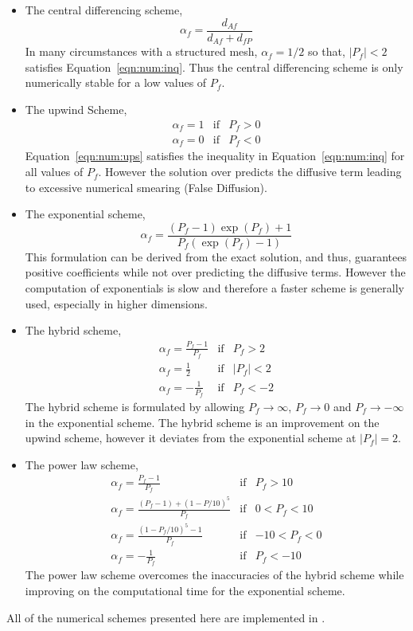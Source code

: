 \begin{itemize}
%
%
%
\item The central differencing scheme,
\begin{equation}
\alpha_f = \frac{d_{Af}}{d_{Af}+d_{fP}}
\label{eqn:num:cds}
\end{equation}
In many circumstances with a structured mesh, $\alpha_f=1/2$ so that,
$|P_f|<2$ satisfies Equation~\eqref{eqn:num:inq}.  Thus the central
differencing scheme is only numerically stable for a low values of
$P_f$.
%
%
%
\item The upwind Scheme,
\begin{eqnarray}
\alpha_f = 1 & \mbox{if} & P_f > 0 \\
\alpha_f = 0 & \mbox{if} & P_f < 0 
\label{eqn:num:ups}
\end{eqnarray}
Equation~\eqref{eqn:num:ups} satisfies the inequality in
Equation~\eqref{eqn:num:inq} for all values of $P_f$.  However the
solution over predicts the diffusive term leading to excessive
numerical smearing (False Diffusion).
%
%
%
\item The exponential scheme,
\begin{equation}
\alpha_f = \frac{(P_f-1)\exp{(P_f)}+1}{P_f(\exp{(P_f)}-1)}
\label{eqn:num:exs}
\end{equation}
This formulation can be derived from the exact solution, and thus,
guarantees positive coefficients while not over predicting the
diffusive terms. However the computation of exponentials is slow and
therefore a faster scheme is generally used, especially in higher
dimensions.
%
%
%
\item The hybrid scheme,
\begin{eqnarray}
\alpha_f = \frac{P_f-1}{P_f} & \mbox{if} & P_f > 2 \\
\alpha_f = \frac{1}{2} & \mbox{if} & |P_f| < 2 \\
\alpha_f = -\frac{1}{P_f} & \mbox{if} & P_f < -2
\label{eqn:num:hys}
\end{eqnarray}
The hybrid scheme is formulated by allowing $P_f \rightarrow \infty$,
$P_f \rightarrow 0$ and $P_f \rightarrow -\infty$ in the exponential
scheme.  The hybrid scheme is an improvement on the upwind scheme,
however it deviates from the exponential scheme at $|P_f|=2$.
%
%
%
\item The power law scheme,
\begin{eqnarray}
\alpha_f = \frac{P_f-1}{P_f} & \mbox{if} & P_f > 10 \\
\alpha_f = \frac{(P_f-1)+(1-P/10)^5}{P_f} & \mbox{if} & 0 < P_f < 10 \\
\alpha_f = \frac{(1-P_f/10)^5 - 1}{P_f} & \mbox{if} & -10 < P_f < 0 \\
\alpha_f = -\frac{1}{P_f} & \mbox{if} & P_f < -10
\label{eqn:num:pls}
\end{eqnarray}
The power law scheme overcomes the inaccuracies of the hybrid scheme
while improving on the computational time for the exponential scheme.
\end{itemize}

All of the numerical schemes presented here are implemented in \FiPy{}.







